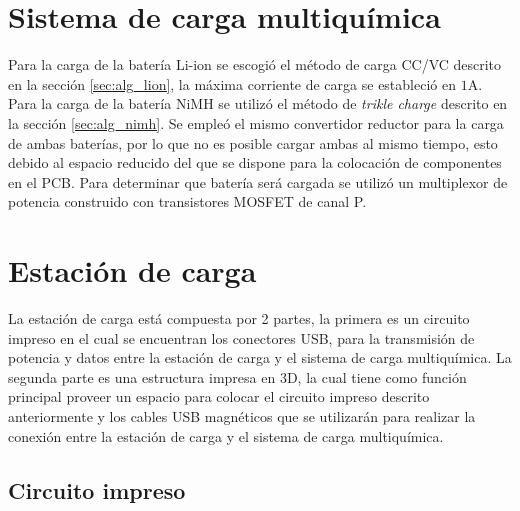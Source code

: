 \chapter{Sistema de carga multiquímica}

Para la carga de la batería Li-ion se escogió el método de carga CC/VC
descrito en la sección \ref{sec:alg_lion}, la máxima corriente de carga
se estableció en $1\text{A}$. Para la carga de la batería NiMH se utilizó
el método de \textit{trikle charge} descrito en la sección 
\ref{sec:alg_nimh}. Se empleó el mismo convertidor reductor para la carga
de ambas baterías, por lo que no es posible cargar ambas al mismo tiempo, esto
debido al espacio reducido del que se dispone para la colocación de componentes
en el PCB.
Para determinar que batería será cargada se utilizó un multiplexor de potencia
construido con transistores MOSFET de canal P.
    

    
    
    

    

    

    

    
    
    



    
        

\chapter{Estación de carga}

La estación de carga está compuesta por 2 partes, la primera es un circuito impreso
en el cual se encuentran los conectores USB, para la transmisión de potencia y 
datos entre la estación de carga y el sistema de carga multiquímica. La segunda
parte es una estructura impresa en 3D, la cual tiene como función principal
proveer un espacio para colocar el circuito impreso descrito anteriormente y 
los cables USB magnéticos que se utilizarán para realizar la conexión entre
la estación de carga y el sistema de carga multiquímica.


\section{Circuito impreso}


